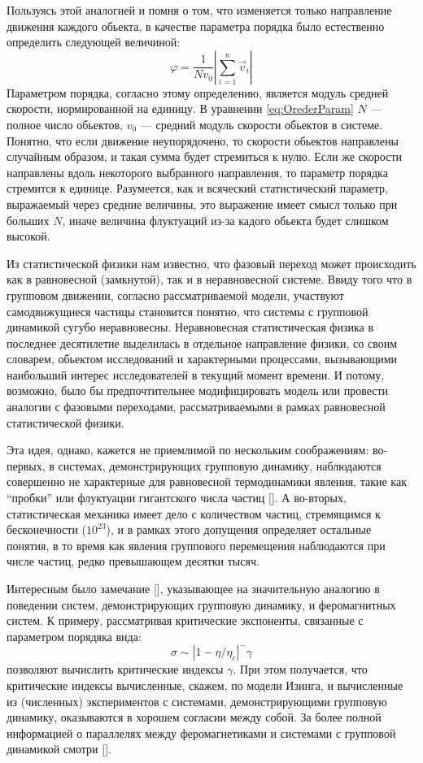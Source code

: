    Пользуясь этой аналогией и помня о том, что изменяется только направление движения каждого обьекта, в качестве параметра порядка было естественно определить следующей величиной:
    \begin{equation}\label{eq:OrederParam}
        \varphi = \frac{1}{N v_0} |{\sum\limits_{i=1}^n \vec{v}_i}|
    \end{equation}
    Параметром порядка, согласно этому определению, является модуль средней скорости, нормированной на единицу. В уравнении \ref{eq:OrederParam} $N$ --- полное число обьектов, $v_0$ --- средний модуль скорости обьектов в системе. Понятно, что если движение неупорядочено, то скорости обьектов направлены случайным образом, и такая сумма будет стремиться к нулю. Если же скорости направлены вдоль некоторого выбранного направления, то параметр порядка стремится к единице. Разумеется, как и всяческий статистический параметр, выражаемый через средние величины, это выражение имеет смысл только при больших $N$, иначе величина флуктуаций из-за кадого обьекта будет слишком высокой.

    Из статистической физики нам известно, что фазовый переход может происходить как в равновесной (замкнутой), так и в неравновесной системе. Ввиду того что в групповом движении, согласно рассматриваемой модели, участвуют самодвижущиеся частицы становится понятно, что системы с групповой динамикой сугубо неравновесны. Неравновесная статистическая физика в последнее десятилетие выделилась в отдельное направление физики, со своим словарем, обьектом исследований и характерными процессами, вызывающими наибольший интерес исследователей в текущий момент времени. И потому, возможно, было бы предпочтительнее модифицировать модель или провести аналогии с фазовыми переходами, рассматриваемыми в рамках равновесной статистической физики.~\cite{vicsek2012}

    Эта идея, однако, кажется не приемлимой по нескольким соображениям: во-первых, в системах, демонстрирующих групповую динамику, наблюдаются совершенно не характерные для равновесной термодинамики явления, такие как ``пробки'' или флуктуации гигантского числа частиц []. А во-вторых, статистическая механика имеет дело с количеством частиц, стремящимся к бесконечности ($10^{23}$), и в рамках этого допущения определяет остальные понятия, в то время как явления группового перемещения наблюдаются при числе частиц, редко превышающем десятки тысяч.

    Интересным было замечание [], указывающее на значительную аналогию в поведении систем, демонстрирующих групповую динамику, и феромагнитных систем. К примеру, рассматривая критические экспоненты, связанные с параметром порядяка вида:
    \begin{equation}
        \sigma \sim |1-\eta/\eta_c|^-\gamma
    \end{equation}
    позволяют вычислить критические индексы $\gamma$. При этом получается, что критические индексы вычисленные, скажем, по модели Изинга, и вычисленные из (численных) экспериментов с системами, демонстрирующими групповую динамику, оказываются в хорошем согласии между собой. За более полной информацией о параллелях между феромагнетиками и системами с групповой динамикой смотри [].

